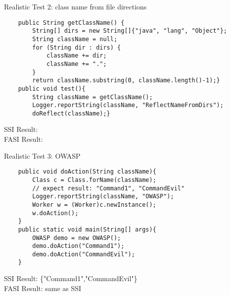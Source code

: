 \documentclass{beamer}
\begin{document}
\begin{frame}[fragile]{Realistic Test 2: class name from file directions}
\begin{lstlisting}
    public String getClassName() {
        String[] dirs = new String[]{"java", "lang", "Object"};
        String className = null;
        for (String dir : dirs) {
            className += dir;
            className += ".";
        }
        return className.substring(0, className.length()-1);}
    public void test(){
        String className = getClassName();
        Logger.reportString(className, "ReflectNameFromDirs");
        doReflect(className);}
\end{lstlisting}
SSI Result:\\
FASI Result:
\end{frame}

\begin{frame}[fragile]{Realistic Test 3: OWASP}
\begin{lstlisting}
    public void doAction(String className){
        Class c = Class.forName(className);
        // expect result: "Command1", "CommandEvil"
        Logger.reportString(className, "OWASP");
        Worker w = (Worker)c.newInstance();
        w.doAction();
    }
    public static void main(String[] args){
        OWASP demo = new OWASP();
        demo.doAction("Command1");
        demo.doAction("CommandEvil");
    }
\end{lstlisting}
SSI Result: \{"Command1","CommandEvil"\} \checkmark\\
FASI Result: same as SSI \checkmark
\end{frame}
\end{document}
